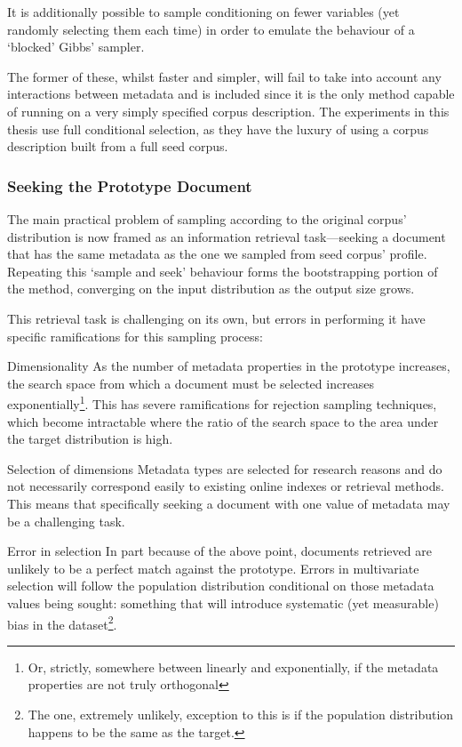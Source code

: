 It is additionally possible to sample conditioning on fewer variables (yet randomly selecting them each time) in order to emulate the behaviour of a `blocked' Gibbs' sampler\cite{gibbs1993}.

The former of these, whilst faster and simpler, will fail to take into account any interactions between metadata and is included since it is the only method capable of running on a very simply specified corpus description.  The experiments in this thesis use full conditional selection, as they have the luxury of using a corpus description built from a full seed corpus.


\subsubsection{Seeking the Prototype Document}
\label{sec:rebuilding:design:seekprototype}
The main practical problem of sampling according to the original corpus' distribution is now framed as an information retrieval task---seeking a document that has the same metadata as the one we sampled from seed corpus' profile.  Repeating this `sample and seek' behaviour forms the bootstrapping portion of the method, converging on the input distribution as the output size grows.

This retrieval task is challenging on its own, but errors in performing it have specific ramifications for this sampling process:

\begin{itemizeTitle}
    \item[Dimensionality]As the number of metadata properties in the prototype increases, the search space from which a document must be selected increases exponentially\footnote{Or, strictly, somewhere between linearly and exponentially, if the metadata properties are not truly orthogonal}.  This has severe ramifications for rejection sampling techniques, which become intractable where the ratio of the search space to the area under the target distribution is high.

    \item[Selection of dimensions]Metadata types are selected for research reasons and do not necessarily correspond easily to existing online indexes or retrieval methods.  This means that specifically seeking a document with one value of metadata may be a challenging task.

    \item[Error in selection]In part because of the above point, documents retrieved are unlikely to be a perfect match against the prototype.  Errors in multivariate selection will follow the population distribution conditional on those metadata values being sought: something that will introduce systematic (yet measurable) bias in the dataset\footnote{The one, extremely unlikely, exception to this is if the population distribution happens to be the same as the target.}.
\end{itemizeTitle}

